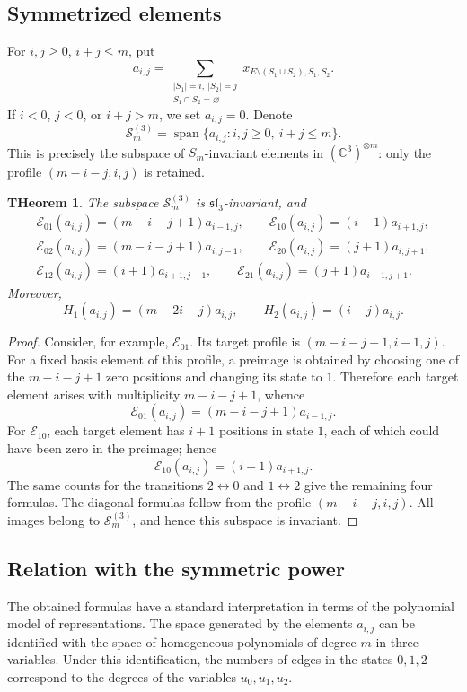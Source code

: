 \documentclass[12pt,reqno]{amsart}
\newtheorem{theorem}{THeorem}[section]
\newcommand{\Span}{\operatorname{span}}
\begin{document}
\subsection{Symmetrized elements}

For $i,j\ge0$, $i+j\le m$, put
$$
a_{i,j}
=
\sum_{\substack{|S_1|=i,\ |S_2|=j\\S_1\cap S_2=\varnothing}}
 x_{E\setminus(S_1\cup S_2),S_1,S_2}.
$$
If $i<0$, $j<0$, or $i+j>m$, we set $a_{i,j}=0$. Denote
$$
\mathcal S_m^{(3)}
=
\Span\{a_{i,j}:i,j\ge0,\ i+j\le m\}.
$$
This is precisely the subspace of $S_m$-invariant elements in
$(\mathbb C^3)^{\otimes m}$: only the profile $(m-i-j,i,j)$ is retained.

\begin{theorem}\label{thm:sl3_symmetrized}
The subspace $\mathcal S_m^{(3)}$ is $\mathfrak{sl}_3$-invariant, and
\begin{gather*}
\mathcal E_{01}(a_{i,j})=(m-i-j+1)a_{i-1,j},
\qquad
\mathcal E_{10}(a_{i,j})=(i+1)a_{i+1,j},\\
\mathcal E_{02}(a_{i,j})=(m-i-j+1)a_{i,j-1},
\qquad
\mathcal E_{20}(a_{i,j})=(j+1)a_{i,j+1},\\
\mathcal E_{12}(a_{i,j})=(i+1)a_{i+1,j-1},
\qquad
\mathcal E_{21}(a_{i,j})=(j+1)a_{i-1,j+1}.
\end{gather*}
Moreover,
$$
H_1(a_{i,j})=(m-2i-j)a_{i,j},
\qquad
H_2(a_{i,j})=(i-j)a_{i,j}.
$$
\end{theorem}

\begin{proof}
Consider, for example, $\mathcal E_{01}$. Its target profile is
$(m-i-j+1,i-1,j)$. For a fixed basis element of this profile, a preimage
is obtained by choosing one of the $m-i-j+1$ zero positions and changing
its state to $1$. Therefore each target element arises with multiplicity
$m-i-j+1$, whence
$$
\mathcal E_{01}(a_{i,j})=(m-i-j+1)a_{i-1,j}.
$$
For $\mathcal E_{10}$, each target element has $i+1$ positions in state
$1$, each of which could have been zero in the preimage; hence
$$
\mathcal E_{10}(a_{i,j})=(i+1)a_{i+1,j}.
$$
The same counts for the transitions $2\leftrightarrow0$ and
$1\leftrightarrow2$ give the remaining four formulas. The diagonal
formulas follow from the profile $(m-i-j,i,j)$. All images belong to
$\mathcal S_m^{(3)}$, and hence this subspace is invariant.
\end{proof}

\subsection{Relation with the symmetric power}
The obtained formulas have a standard interpretation in terms of the
polynomial model of representations. The space generated by the elements
$a_{i,j}$ can be identified with the space of homogeneous polynomials of
degree $m$ in three variables. Under this identification, the numbers of
edges in the states $0,1,2$ correspond to the degrees of the variables
$u_0,u_1,u_2$.
\end{document}
